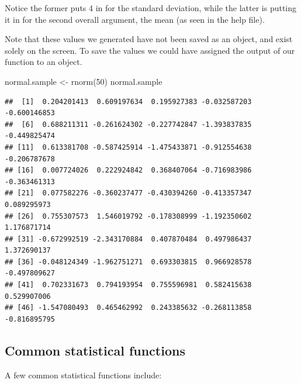 \documentclass[
]{book}
\newenvironment{Shaded}{\begin{snugshade}}{\end{snugshade}}
\newcommand{\DecValTok}[1]{\textcolor[rgb]{0.00,0.00,0.81}{#1}}
\newcommand{\FunctionTok}[1]{\textcolor[rgb]{0.00,0.00,0.00}{#1}}
\newcommand{\NormalTok}[1]{#1}
\newcommand{\OtherTok}[1]{\textcolor[rgb]{0.56,0.35,0.01}{#1}}
\begin{document}
Notice the former puts 4 in for the standard deviation, while the latter is putting it in for the second overall argument, the mean (as seen in the help file).

Note that these values we generated have not been saved as an object, and exist solely on the screen. To save the values we could have assigned the output of our function to an object.

\begin{Shaded}
\begin{Highlighting}[]
\NormalTok{normal.sample }\OtherTok{\textless{}{-}} \FunctionTok{rnorm}\NormalTok{(}\DecValTok{50}\NormalTok{)}
\NormalTok{normal.sample}
\end{Highlighting}
\end{Shaded}

\begin{verbatim}
##  [1]  0.204201413  0.609197634  0.195927383 -0.032587203 -0.600146853
##  [6]  0.688211311 -0.261624302 -0.227742847 -1.393837835 -0.449825474
## [11]  0.613381708 -0.587425914 -1.475433871 -0.912554638 -0.206787678
## [16]  0.007724026  0.222924842  0.368407064 -0.716983986 -0.363461313
## [21]  0.077582276 -0.360237477 -0.430394260 -0.413357347  0.089295973
## [26]  0.755307573  1.546019792 -0.178308999 -1.192350602  1.176871714
## [31] -0.672992519 -2.343170884  0.407870484  0.497986437  1.372690137
## [36] -0.048124349 -1.962751271  0.693303815  0.966928578 -0.497809627
## [41]  0.702331673  0.794193954  0.755596981  0.582415638  0.529907006
## [46] -1.547080493  0.465462992  0.243385632 -0.268113858 -0.816895795
\end{verbatim}

\hypertarget{common-statistical-functions}{%
\subsection*{Common statistical functions}\label{common-statistical-functions}}

A few common statistical functions include:
\end{document}
